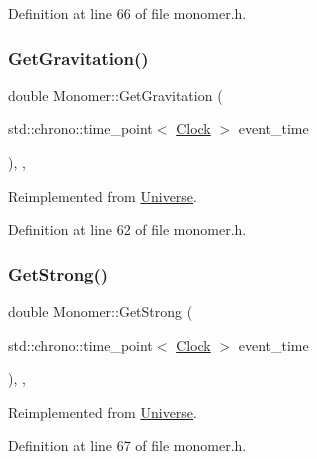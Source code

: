 Definition at line 66 of file monomer.\+h.

\mbox{\label{class_monomer_aa5f7b901e15c9a9eb6e1c3564cd06e4f}} 
\subsubsection{\texorpdfstring{Get\+Gravitation()}{GetGravitation()}}
{\footnotesize\ttfamily double Monomer\+::\+Get\+Gravitation (\begin{DoxyParamCaption}\item[{std\+::chrono\+::time\+\_\+point$<$ \mbox{\hyperlink{universe_8h_a0ef8d951d1ca5ab3cfaf7ab4c7a6fd80}{Clock}} $>$}]{event\+\_\+time }\end{DoxyParamCaption})\hspace{0.3cm}{\ttfamily [inline]}, {\ttfamily [final]}, {\ttfamily [virtual]}}



Reimplemented from \mbox{\hyperlink{class_universe_ab0404e774ee0ed66b597ff5b8e989446}{Universe}}.



Definition at line 62 of file monomer.\+h.

\mbox{\label{class_monomer_aa35033340e88c46757d1d5ccba21a21e}} 
\subsubsection{\texorpdfstring{Get\+Strong()}{GetStrong()}}
{\footnotesize\ttfamily double Monomer\+::\+Get\+Strong (\begin{DoxyParamCaption}\item[{std\+::chrono\+::time\+\_\+point$<$ \mbox{\hyperlink{universe_8h_a0ef8d951d1ca5ab3cfaf7ab4c7a6fd80}{Clock}} $>$}]{event\+\_\+time }\end{DoxyParamCaption})\hspace{0.3cm}{\ttfamily [inline]}, {\ttfamily [final]}, {\ttfamily [virtual]}}



Reimplemented from \mbox{\hyperlink{class_universe_acb453ce71da418c5b5617fecede9571b}{Universe}}.



Definition at line 67 of file monomer.\+h.

